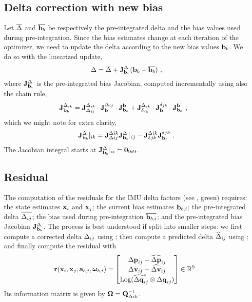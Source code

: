 \subsection{Delta correction with new bias}

Let $\overline{\Delta}$ and $\overline{{\bf b}_b}$ be respectively the pre-integrated delta and the bias values used during pre-integration. Since the bias estimates change at each iteration of the optimizer, we need to update the delta according to the new bias values ${\bf b}_b$. We do so with the linearized update,
%
\begin{align}\label{equ:delta_correction}
\Delta = \overline{\Delta} + {{\bf J}^{\Delta}_{{\bf b}_b}}({\bf b}_b - \overline{{\bf b}_b})
~,
\end{align}
%
where ${{\bf J}^{\Delta}_{{\bf b}_b}}$ is the pre-integrated bias Jacobian, computed incrementally using also the chain rule,
%
\begin{align*}
{{\bf J}^{\Delta_{ik}}_{{\bf b}_b}} 
&= 
{{\bf J}^{\Delta_{ik}}_{\Delta_{ij}}} \cdot {{\bf J}^{\Delta_{ij}}_{{\bf b}}} \cdot {{\bf J}^{{\bf b}}_{{\bf b}_b}} 
+ 
{{\bf J}^{\Delta_{ik}}_{\delta_{jk}}} \cdot {{\bf J}^{\delta_{jk}}_{{\bf b}}} \cdot {{\bf J}^{{\bf b}}_{{\bf b}_b}} 
~,
\end{align*}
%
which we might note for extra clarity,
%
\begin{align}
{{\bf J}^{\Delta}_{{\bf b}_b}}|_{ik} = {{\bf J}^{\Delta ik}_{\Delta ij}}{{\bf J}^{\Delta}_{{\bf b}_b}}|_{ij} - {{\bf J}^{\Delta ik}_{\delta jk}}{{\bf J}^{\delta jk}_{{\bf b}_b}}
~.
\end{align}
%
The Jacobian integral starts at ${{\bf J}^{\Delta}_{{\bf b}_b}}|_{ii} = {\bf0}_{9\!\times\! 9}$.


\subsection{Residual}

The computation of the residuals for the IMU delta factors (see , green) requires: the state estimates ${\bf x}_i$ and ${\bf x}_j$; the current bias estimates ${\bf b}_{b,i}$; the pre-integrated delta $\overline{\Delta_{ij}}$; the bias used during pre-integration $\overline{{\bf b}_{b,i}}$; and the pre-integrated bias Jacobian ${{\bf J}^{\Delta}_{{\bf b}_b}}$. The process is best understood if split into smaller steps: we first compute a corrected delta $\Delta_{ij}$ using ; then compute a predicted delta $\widehat{\Delta}_{ij}$ using ; and finally compute the residual with
%
\begin{align}\label{equ:imu_residual}
{\bf r}({\bf x}_i,{\bf x}_j,{\bf a}_{b,i},{{\bm \omega}}_{b,i}) 
= \begin{bmatrix}
{\Delta{\bf p}}_{ij}-\widehat{{\Delta{\bf p}}}_{ij} \\
{\Delta{\bf v}}_{ij}-\widehat{{\Delta{\bf v}}}_{ij} \\
\operatorname*{Log}(\widehat{{\Delta{\bf q}}}_{ij}^*\otimes{\Delta{\bf q}}_{ij})
\end{bmatrix} 
\in {\mathbb R}^9
~.
\end{align}
%
Its information matrix is given by ${\bm \Omega}={\bf Q}_{\Delta ik}^{-1}$.







